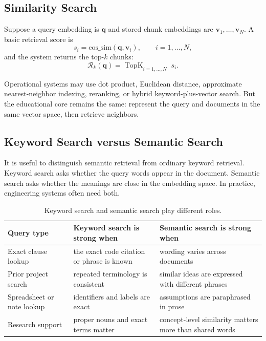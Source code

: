 \documentclass[12pt]{article}
\begin{document}
\subsection{Similarity Search}

Suppose a query embedding is $\mathbf{q}$ and stored chunk embeddings are $\mathbf{v}_1,\dots,\mathbf{v}_N$. A basic retrieval score is
\begin{equation}
    s_i = \mathrm{cos\_sim}(\mathbf{q},\mathbf{v}_i),
    \qquad i=1,\dots,N,
    \label{t15eq:retrieval_score}
\end{equation}
and the system returns the top-$k$ chunks:
\begin{equation}
    \mathcal{R}_k(\mathbf{q}) = \operatorname{TopK}_{i=1,\dots,N}\; s_i.
    \label{t15eq:topk}
\end{equation}

Operational systems may use dot product, Euclidean distance, approximate nearest-neighbor indexing, reranking, or hybrid keyword-plus-vector search. But the educational core remains the same: represent the query and documents in the same vector space, then retrieve neighbors.

\subsection{Keyword Search versus Semantic Search}

It is useful to distinguish semantic retrieval from ordinary keyword retrieval. Keyword search asks whether the query words appear in the document. Semantic search asks whether the meanings are close in the embedding space. In practice, engineering systems often need both.

\begin{table}[ht]
    \centering
    \caption{Keyword search and semantic search play different roles.}
    \begin{tabulary}{\textwidth}{L L L}
        \toprule
        \textbf{Query type} & \textbf{Keyword search is strong when} & \textbf{Semantic search is strong when} \\
        \midrule
        Exact clause lookup & the exact code citation or phrase is known & wording varies across documents \\
        Prior project search & repeated terminology is consistent & similar ideas are expressed with different phrases \\
        Spreadsheet or note lookup & identifiers and labels are exact & assumptions are paraphrased in prose \\
        Research support & proper nouns and exact terms matter & concept-level similarity matters more than shared words \\
        \bottomrule
    \end{tabulary}
\end{table}
\end{document}
